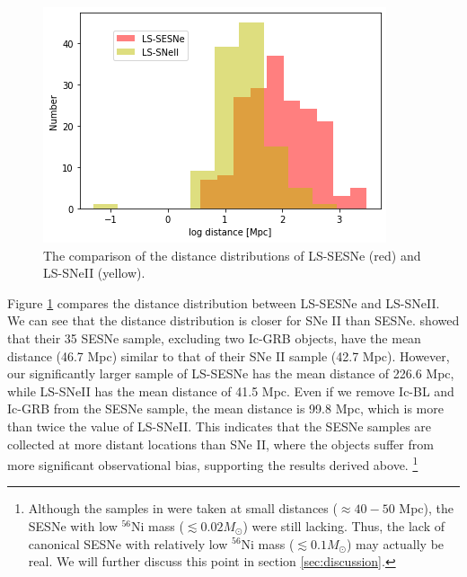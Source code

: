 \documentclass[twocolumn, linenumbers]{aastex62}
\begin{document}

\begin{figure}[htbp]
	\includegraphics[width=\columnwidth]{D_dist_all.png}
    \caption{The comparison of the distance distributions of LS-SESNe (red) and LS-SNeII (yellow).}
     \label{D_dist_all}
\end{figure}

Figure \ref{D_dist_all} compares the distance distribution between LS-SESNe and LS-SNeII. We can see that the distance distribution is closer for SNe II than SESNe. 
\citet{2020A&A...641A.177M} showed that their 35 SESNe sample, excluding two Ic-GRB objects, have the mean distance (46.7 Mpc) similar to that of their SNe II sample (42.7 Mpc). However, our significantly larger sample of LS-SESNe has the mean distance of 226.6 Mpc, while LS-SNeII has the mean distance of 41.5 Mpc. Even if we remove Ic-BL and Ic-GRB from the SESNe sample, the mean distance is 99.8 Mpc, which is more than twice the value of LS-SNeII. This indicates that the SESNe samples are collected at more distant locations than SNe II, where the objects suffer from more significant observational bias, supporting the results derived above. 
\footnote{Although the samples in \citet{2020A&A...641A.177M} were taken at small distances ($\approx 40-50$ Mpc), the SESNe with low $^{56}$Ni mass ($\lesssim 0.02 M_{\odot}$) were still lacking.  Thus, the lack of canonical SESNe with relatively low $^{56}$Ni mass ($\lesssim 0.1M_{\odot}$) may actually be real. We will further discuss this point in section \ref{sec:discussion}.}
\end{document}
